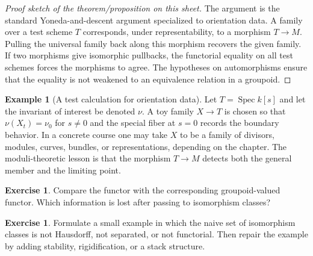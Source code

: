 \documentclass[11pt]{amsart}
\theoremstyle{definition}
\newtheorem{example}[theorem]{Example}
\newtheorem{exercise}[theorem]{Exercise}
\newcommand{\Spec}{\operatorname{Spec}}
\begin{document}
\begin{proof}[Proof sketch of the theorem/proposition on this sheet]
The argument is the standard Yoneda-and-descent argument specialized to orientation data.  A family over a test scheme $T$ corresponds, under representability, to a morphism $T\to M$.  Pulling the universal family back along this morphism recovers the given family.  If two morphisms give isomorphic pullbacks, the functorial equality on all test schemes forces the morphisms to agree.  The hypotheses on automorphisms ensure that the equality is not weakened to an equivalence relation in a groupoid.
\end{proof}
\begin{example}[A test calculation for orientation data]
Let $T=\Spec k[s]$ and let the invariant of interest be denoted $\nu$.  A toy family $X\to T$ is chosen so that $\nu(X_t)=\nu_0$ for $s\ne0$ and the special fiber at $s=0$ records the boundary behavior.  In a concrete course one may take $X$ to be a family of divisors, modules, curves, bundles, or representations, depending on the chapter.  The moduli-theoretic lesson is that the morphism $T\to M$ detects both the general member and the limiting point.
\end{example}
\begin{exercise}
Compare the functor with the corresponding groupoid-valued functor.  Which information is lost after passing to isomorphism classes?
\end{exercise}
\begin{exercise}
Formulate a small example in which the naive set of isomorphism classes is not Hausdorff, not separated, or not functorial.  Then repair the example by adding stability, rigidification, or a stack structure.
\end{exercise}
\clearpage
\end{document}
